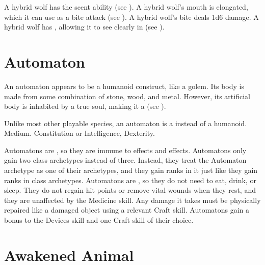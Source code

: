 
    \begin{raggeditemize}
       A hybrid wolf has the scent ability (see ).
       A hybrid wolf's mouth is elongated, which it can use as a bite attack (see ).
        A hybrid wolf's bite deals 1d6 damage.
       A hybrid wolf has , allowing it to see clearly in  (see ).
    \end{raggeditemize}

\section{Automaton}\label{Automaton}
  An automaton appears to be a humanoid construct, like a golem.
  Its body is made from some combination of stone, wood, and metal.
  However, its artificial body is inhabited by a true soul, making it a  (see ).

   Unlike most other playable species, an automaton is a    instead of a  humanoid.
   Medium.
    Constitution or Intelligence,  Dexterity.
  \begin{raggeditemize}
     Automatons are , so they are immune to \atLife effects and \atPoison effects.
     Automatons only gain two class archetypes instead of three.
      Instead, they treat the Automaton archetype as one of their archetypes, and they gain ranks in it just like they gain ranks in class archetypes.
     Automatons are , so they do not need to eat, drink, or sleep. 
      They do not regain hit points or remove vital wounds when they rest, and they are unaffected by the Medicine skill.
      Any damage it takes must be physically repaired like a damaged object using a relevant Craft skill.
     Automatons gain a  bonus to the Devices skill and one Craft skill of their choice.
  \end{raggeditemize}



\section{Awakened Animal}


